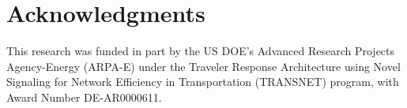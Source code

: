 \documentclass[numbered]{trbunofficial}\usepackage[]{graphicx}\usepackage[]{color}
\begin{document}
\section{Acknowledgments}
This research was funded in part by the US DOE's Advanced Research Projects Agency-Energy (ARPA-E) under the Traveler Response Architecture using Novel Signaling for Network Efficiency in Transportation (TRANSNET) program, with Award Number DE-AR0000611.





\pagebreak

\end{document}
